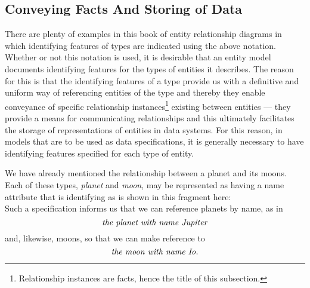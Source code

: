 \subsection{Conveying Facts And Storing of Data}
There are plenty of examples in this book of entity relationship diagrams 
in which identifying features of types are indicated using the 
above notation. Whether or not this notation is used, it is desirable that an entity model documents identifying features for the types of entities it describes. 
The reason for this is that the identifying features of a type
provide us with a definitive and uniform way of referencing entities of the type and thereby they enable conveyance of  specific relationship instances\footnote{Relationship instances are facts, hence the title of this subsection. }
existing between entities 
--- they provide a means for communicating  relationships and this ultimately facilitates the storage of representations of entities in data systems. For this reason, in models that are to be used as data specifications, it is generally necessary to have identifying features specified for each type of entity.  

\mynote
We have already mentioned the relationship between
a planet and its moons.
Each of these types, \textit{planet} and  \textit{moon}, may be represented as having 
a name attribute that is identifying as is shown in this fragment here:
\begin{equation}
\label{planetMoonModel}

\end{equation}
Such a specification informs us that we can reference planets by name,
 as in 
\begin{equation}
\label{theplanetJupiter}
\mbox{\textit{the planet with name Jupiter}}
\end{equation}
and, likewise, moons, so that we can make reference to 
\begin{equation}
\label{themoonIo}
\mbox{\textit{the moon with name Io}}.
\end{equation}

